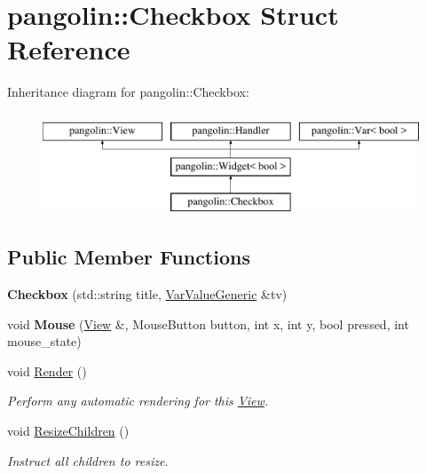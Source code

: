 \hypertarget{structpangolin_1_1_checkbox}{}\section{pangolin\+:\+:Checkbox Struct Reference}
\label{structpangolin_1_1_checkbox}
Inheritance diagram for pangolin\+:\+:Checkbox\+:\begin{figure}[H]
\begin{center}
\leavevmode
\includegraphics[height=3.000000cm]{structpangolin_1_1_checkbox}
\end{center}
\end{figure}
\subsection*{Public Member Functions}
\begin{DoxyCompactItemize}
\item 
{\bfseries Checkbox} (std\+::string title, \hyperlink{classpangolin_1_1_var_value_generic}{Var\+Value\+Generic} \&tv)\hypertarget{structpangolin_1_1_checkbox_a774a603e8eb3504ecfdc3b91a03274be}{}\label{structpangolin_1_1_checkbox_a774a603e8eb3504ecfdc3b91a03274be}

\item 
void {\bfseries Mouse} (\hyperlink{structpangolin_1_1_view}{View} \&, Mouse\+Button button, int x, int y, bool pressed, int mouse\+\_\+state)\hypertarget{structpangolin_1_1_checkbox_a565837d74e7e09121fbda5b12a5b210d}{}\label{structpangolin_1_1_checkbox_a565837d74e7e09121fbda5b12a5b210d}

\item 
void \hyperlink{structpangolin_1_1_checkbox_aa6e9cf9fd2a35b06e0a6462ccd50747d}{Render} ()
\begin{DoxyCompactList}\small\item\em Perform any automatic rendering for this \hyperlink{structpangolin_1_1_view}{View}. \end{DoxyCompactList}\item 
void \hyperlink{structpangolin_1_1_checkbox_a05c067eb4d3e7f7b95dab56c63768b01}{Resize\+Children} ()\hypertarget{structpangolin_1_1_checkbox_a05c067eb4d3e7f7b95dab56c63768b01}{}\label{structpangolin_1_1_checkbox_a05c067eb4d3e7f7b95dab56c63768b01}

\begin{DoxyCompactList}\small\item\em Instruct all children to resize. \end{DoxyCompactList}\end{DoxyCompactItemize}

